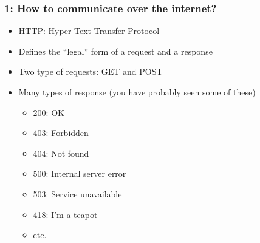 \documentclass{beamer}
\begin{document}




\begin{frame}
  \frametitle{1: How to communicate over the internet?}

  \begin{itemize}
  \item HTTP: Hyper-Text Transfer Protocol
  \item Defines the ``legal'' form of a request and a response
  \item Two type of requests: GET and POST
  \item Many types of response (you have probably seen some of these)
    \begin{itemize}
    \item 200: OK
    \item 403: Forbidden
    \item 404: Not found
    \item 500: Internal server error
    \item 503: Service unavailable
    \item 418: I'm a teapot
    \item etc.
    \end{itemize}
  \end{itemize}
\end{frame}
\end{document}
